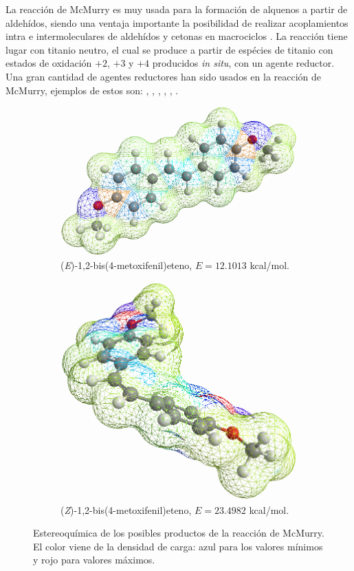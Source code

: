 \documentclass[fleqn,11pt]{SelfArx}
\begin{document}
La reacci\'on de McMurry es muy usada para la formaci\'on de alquenos a partir de aldeh\'idos, siendo una ventaja importante la posibilidad de realizar acoplamientos intra e intermoleculares de aldeh\'idos y cetonas en macrociclos \cite{Wang2010, Villiers1997}. La reacci\'on tiene lugar con titanio neutro, el cual se produce a partir de esp\'ecies de titanio con estados de oxidaci\'on $+2$, $+3$ y $+4$ producidos \textit{in situ}, con un agente reductor. Una gran cantidad de agentes reductores han sido usados en la reacci\'on de McMurry, ejemplos de estos son: , , , , ,  \cite{Wang2010}.

\begin{figure}[ht]
	\centering
	\begin{subfigure}[t]{0.49\linewidth}
		\centering
		\includegraphics[width=0.9\linewidth]{structures/productE.png}
		\caption{(\textit{E})-1,2-bis(4-metoxifenil)eteno, $E=12.1013$ kcal/mol.}
	\end{subfigure}
	\begin{subfigure}[t]{0.49\linewidth}
		\centering
		\includegraphics[width=0.7\linewidth]{structures/productZ.png}
		\caption{(\textit{Z})-1,2-bis(4-metoxifenil)eteno, $E=23.4982$ kcal/mol.}
	\end{subfigure}
	\caption{Estereoqu\'imica de los posibles productos de la reacci\'on de McMurry. El color viene de la densidad de carga: azul para los valores m\'inimos y rojo para valores m\'aximos.}
	\label{fig: both}
\end{figure}
\end{document}
